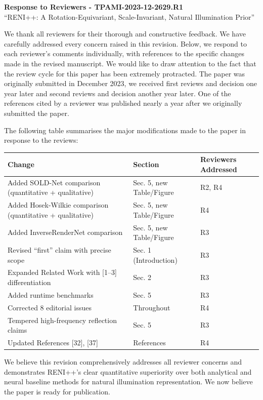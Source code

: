 \documentclass[11pt]{article}
\begin{document}
\begin{center}
{\LARGE \textbf{Response to Reviewers - TPAMI-2023-12-2629.R1}}\\[0.5em]
{\large ``RENI++: A Rotation-Equivariant, Scale-Invariant, Natural Illumination Prior''}
\end{center}

\vspace{1em}

We thank all reviewers for their thorough and constructive feedback. We have carefully addressed every concern raised in this revision. Below, we respond to each reviewer's comments individually, with references to the specific changes made in the revised manuscript. We would like to draw attention to the fact that the review cycle for this paper has been extremely protracted. The paper was originally submitted in December 2023, we received first reviews and decision one year later and second reviews and decision another year later. One of the references cited by a reviewer was published nearly a year after we originally submitted the paper.

The following table summarises the major modifications made to the paper in response to the reviews:
\begin{table}[h]
\centering
\small
\begin{tabular}{lll}
\toprule
Change & Section & Reviewers Addressed \\
\midrule
Added SOLD-Net comparison (quantitative + qualitative) & Sec. 5, new Table/Figure & R2, R4 \\
Added Hosek-Wilkie comparison (quantitative + qualitative) & Sec. 5, new Table/Figure & R4 \\
Added InverseRenderNet comparison & Sec. 5, new Table/Figure & R3 \\
Revised ``first'' claim with precise scope & Sec. 1 (Introduction) & R3 \\
Expanded Related Work with [1--3] differentiation & Sec. 2 & R3 \\
Added runtime benchmarks & Sec. 5 & R3 \\
Corrected 8 editorial issues & Throughout & R4 \\
Tempered high-frequency reflection claims & Sec. 5 & R3 \\
Updated References [32], [37] & References & R4 \\
\bottomrule
\end{tabular}
\end{table}

We believe this revision comprehensively addresses all reviewer concerns and demonstrates RENI++'s clear quantitative superiority over both analytical and neural baseline methods for natural illumination representation. We now believe the paper is ready for publication.
\end{document}
